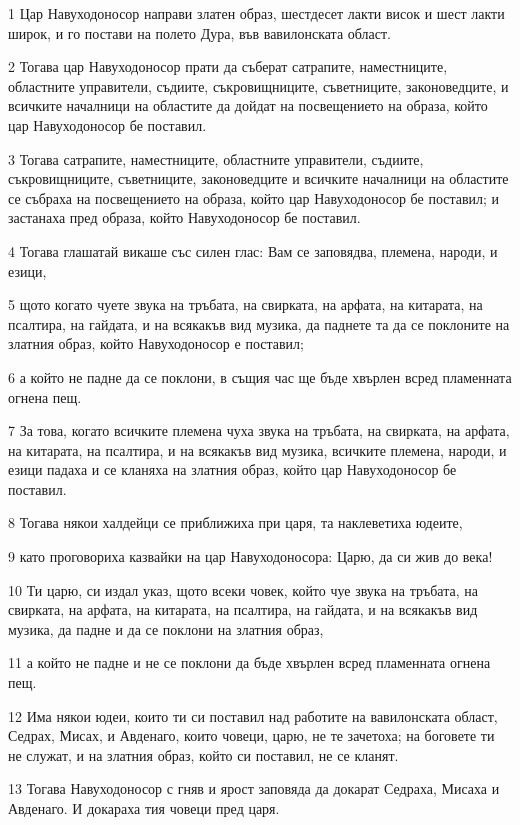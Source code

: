 \par 1 Цар Навуходоносор направи златен образ, шестдесет лакти висок и шест лакти широк, и го постави на полето Дура, във вавилонската област.
\par 2 Тогава цар Навуходоносор прати да съберат сатрапите, наместниците, областните управители, съдиите, съкровищниците, съветниците, законоведците, и всичките началници на областите да дойдат на посвещението на образа, който цар Навуходоносор бе поставил.
\par 3 Тогава сатрапите, наместниците, областните управители, съдиите, съкровищниците, съветниците, законоведците и всичките началници на областите се събраха на посвещението на образа, който цар Навуходоносор бе поставил; и застанаха пред образа, който Навуходоносор бе поставил.
\par 4 Тогава глашатай викаше със силен глас: Вам се заповядва, племена, народи, и езици,
\par 5 щото когато чуете звука на тръбата, на свирката, на арфата, на китарата, на псалтира, на гайдата, и на всякакъв вид музика, да паднете та да се поклоните на златния образ, който Навуходоносор е поставил;
\par 6 а който не падне да се поклони, в същия час ще бъде хвърлен всред пламенната огнена пещ.
\par 7 За това, когато всичките племена чуха звука на тръбата, на свирката, на арфата, на китарата, на псалтира, и на всякакъв вид музика, всичките племена, народи, и езици падаха и се кланяха на златния образ, който цар Навуходоносор бе поставил.
\par 8 Тогава някои халдейци се приближиха при царя, та наклеветиха юдеите,
\par 9 като проговориха казвайки на цар Навуходоносора: Царю, да си жив до века!
\par 10 Ти царю, си издал указ, щото всеки човек, който чуе звука на тръбата, на свирката, на арфата, на китарата, на псалтира, на гайдата, и на всякакъв вид музика, да падне и да се поклони на златния образ,
\par 11 а който не падне и не се поклони да бъде хвърлен всред пламенната огнена пещ.
\par 12 Има някои юдеи, които ти си поставил над работите на вавилонската област, Седрах, Мисах, и Авденаго, които човеци, царю, не те зачетоха; на боговете ти не служат, и на златния образ, който си поставил, не се кланят.
\par 13 Тогава Навуходоносор с гняв и ярост заповяда да докарат Седраха, Мисаха и Авденаго. И докараха тия човеци пред царя.
